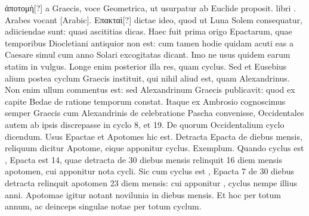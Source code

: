  \textgreek{ἀποτομὴ[?]} a Graecis,
voce Geometrica, ut usurpatur ab Euclide proposit.
 libri
.
Arabes vocant \textarabic{[Arabic]}.
\textgreek{Επακταὶ[?]} dictae ideo, quod ut Luna Solem
consequatur, adiiciendae sunt: quasi ascititias dicas.
Haec fuit
prima origo Epactarum, quae temporibus Diocletiani antiquior
non est: cum tamen hodie quidam acuti eas a Caesare simul cum anno
Solari excogitatas dicant.
Imo ne usus quidem earum statim in vulgus.
Longe enim posterior illa res, %
 quam cyclus.
Sed et Eusebius
alium postea cyclum Graecis instituit, qui nihil aliud est, quam Alexandrinus.
%
Non enim ullum commentus est: sed Alexandrinum Graecis
publicavit: quod ex  capite Bedae de ratione temporum
constat.
Itaque ex Ambrosio cognoscimus semper Graecis cum Alexandrinis
de celebratione Pascha convenisse, Occidentales autem ab
ipsis discrepasse in cyclo 8, et 19.
De quorum Occidentalium cyclo
dicendum.
Usus Epactae et Apotomes hic est.
Detracta Epacta de
diebus mensis, reliquum dicitur Apotome, eique apponitur cyclus.
Exemplum.
Quando cyclus est , Epacta est 14, quae detracta de
30 diebus mensis relinquit 16 diem mensis apotomen, cui apponitur
 nota cycli.
Sic cum cyclus est , Epacta 7 de 30 diebus detracta
relinquit apotomen 23 diem mensis: cui apponitur , cyclus
nempe illius anni.
Apotomae igitur notant novilunia in diebus mensis.
Et hoc per totum annum, ac deinceps singulae notae per totum
cyclum.
%
